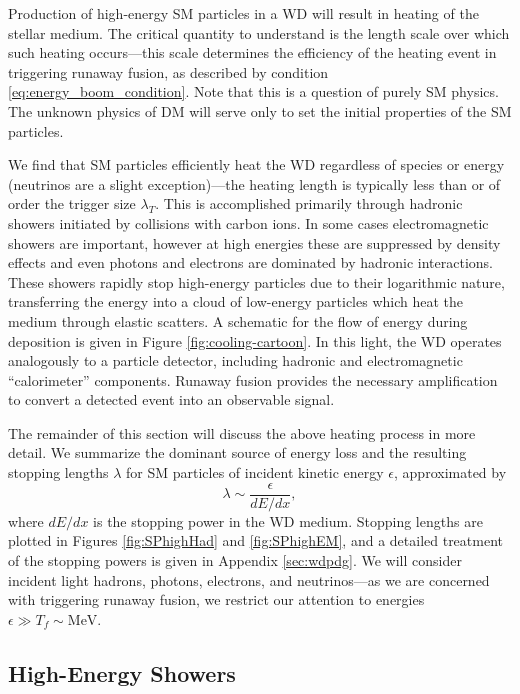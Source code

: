 Production of high-energy SM particles in a WD will result in heating of the stellar medium.
The critical quantity to understand is the length scale over which such heating occurs---this scale determines the efficiency of the heating event in triggering runaway fusion, as described by condition \eqref{eq:energy_boom_condition}.
Note that this is a question of purely SM physics.
The unknown physics of DM will serve only to set the initial properties of the SM particles.

We find that SM particles efficiently heat the WD regardless of species or energy (neutrinos are a slight exception)---the heating length is typically less than or of order the trigger size $\lambda_T$. 
This is accomplished primarily through hadronic showers initiated by collisions with carbon ions.
In some cases electromagnetic showers are important, however at high energies these are suppressed by density effects and even photons and electrons are dominated by hadronic interactions.
These showers rapidly stop high-energy particles due to their logarithmic nature, transferring the energy into a cloud of low-energy particles which heat the medium through elastic scatters.
A schematic for the flow of energy during deposition is given in Figure \ref{fig:cooling-cartoon}.
In this light, the WD operates analogously to a particle detector, including hadronic and electromagnetic ``calorimeter'' components.
Runaway fusion provides the necessary amplification to convert a detected event into an observable signal.

The remainder of this section will discuss the above heating process in more detail.
We summarize the dominant source of energy loss and the resulting stopping lengths $\lambda$ for SM particles of incident kinetic energy $\epsilon$, approximated by
\begin{equation}
\lambda \sim \frac{\epsilon}{dE/dx},
\end{equation}
where $dE/dx$ is the stopping power in the WD medium.
Stopping lengths are plotted in Figures \ref{fig:SPhighHad} and \ref{fig:SPhighEM}, and a detailed treatment of the stopping powers is given in Appendix \ref{sec:wdpdg}. 
We will consider incident light hadrons, photons, electrons, and neutrinos---as we are concerned with triggering runaway fusion, we restrict our attention to energies $\epsilon \gg T_f \sim \text{MeV}$.

\subsection{High-Energy Showers}

